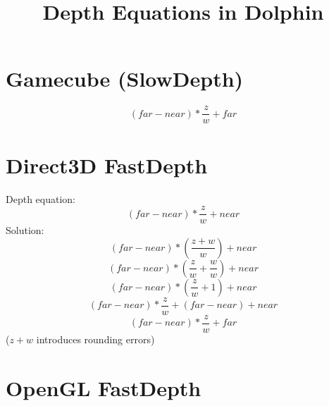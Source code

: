 \documentclass[10pt]{article}
\title{\vspace{-2cm}Depth Equations in Dolphin}
\author{}
\date{\vspace{-1cm}}
\begin{document}
\maketitle

\section{Gamecube (SlowDepth)}
\begin{equation}
(far - near) * \frac{z}{w} + far
\end{equation}

\section{Direct3D FastDepth}

Depth equation:
\begin{equation}
(far - near) * \frac{z}{w} + near
\end{equation}
Solution:
\begin{equation}
(far - near) * ( \frac{z + w}{w} ) + near
\end{equation}
\begin{equation}
(far - near) * ( \frac{z}{w} + \frac{w}{w} ) + near
\end{equation}
\begin{equation}
(far - near) * ( \frac{z}{w} + 1 ) + near
\end{equation}
\begin{equation}
(far - near) * \frac{z}{w} + (far - near) + near
\end{equation}
\begin{equation}
(far - near) * \frac{z}{w} + far
\end{equation}
($z + w$ introduces rounding errors)

\section{OpenGL FastDepth}
\end{document}
